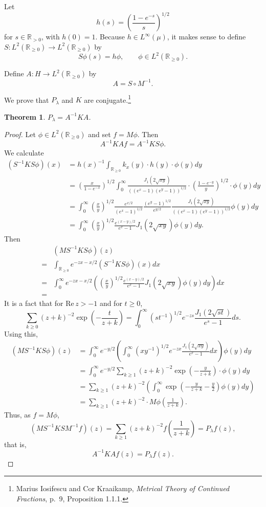 \documentclass{article}
\def\Re{\ensuremath{\mathrm{Re}}\,}
\newtheorem{theorem}{Theorem}
\theoremstyle{definition}
\begin{document}
Let 
\[
h(s)=\left(\frac{1-e^{-s}}{s} \right)^{1/2}
\]
for $s \in \mathbb{R}_{>0}$, with
$h(0)=1$.
 Because $h \in L^\infty(\mu)$, it makes sense to define
 $S:L^2(\mathbb{R}_{\geq 0}) \to L^2(\mathbb{R}_{\geq 0})$ by
\[
S \phi(s) = h \phi,\qquad \phi \in L^2(\mathbb{R}_{\geq 0}).
\]

Define $A:H \to L^2(\mathbb{R}_{\geq 0})$ by 
\[
A = S \circ M^{-1}.
\]


We prove that $P_\lambda$ and $K$ are conjugate.\footnote{Marius Iosifescu and Cor Kraaikamp,
{\em Metrical Theory of Continued Fractions}, p.~9, Proposition 1.1.1.}



\begin{theorem}
$P_\lambda = A^{-1}KA$.
\end{theorem}
\begin{proof}
Let $\phi \in L^2(\mathbb{R}_{\geq 0})$ and set $f=M\phi$. Then
\[
A^{-1}KAf = A^{-1}KS\phi.
\]
We calculate
\begin{align*}
(S^{-1}KS\phi)(x)&=h(x)^{-1} \int_{\mathbb{R}_{\geq 0}} k_x(y) \cdot h(y) \cdot \phi(y) dy\\
&=\left(\frac{x}{1-e^{-x}} \right)^{1/2}
\int_0^\infty 
 \frac{J_1(2 \sqrt{xy})}{((e^x-1)(e^y-1))^{1/2}}
 \cdot \left(\frac{1-e^{-y}}{y} \right)^{1/2}
 \cdot \phi(y) dy\\
 &=\int_0^\infty \left( \frac{x}{y} \right)^{1/2} \frac{e^{x/2}}{(e^x-1)^{1/2}} \frac{(e^y-1)^{1/2}}{e^{y/2}}  \frac{J_1(2 \sqrt{xy})}{((e^x-1)(e^y-1))^{1/2}}
 \phi(y) dy\\
 &=\int_0^\infty  \left( \frac{x}{y} \right)^{1/2} \frac{e^{(x-y)/2}}{e^x-1} J_1(2 \sqrt{xy})\phi(y) dy.
\end{align*}
Then
\[
\begin{split}
&(MS^{-1}KS\phi)(z)\\
=&\int_{\mathbb{R}_{\geq 0}} e^{-zx -x/2} (S^{-1}KS\phi)(x) dx\\
=&\int_0^\infty e^{-zx-x/2} \left(  \left( \frac{x}{y} \right)^{1/2} \frac{e^{(x-y)/2}}{e^x-1} J_1(2 \sqrt{xy})\phi(y) dy \right) dx\\
=&
\end{split}
\]
It is a fact that for $\Re z>-1$ and for $t \geq 0$,
\[
\sum_{k \geq 0} (z+k)^{-2} \exp\left(-\frac{t}{z+k} \right) = \int_0^\infty (s t^{-1})^{1/2} e^{-zs} \frac{J_1(2\sqrt{st})}{e^s-1} ds.
\]
Using this,
\begin{align*}
(MS^{-1}KS\phi)(z)&=\int_0^\infty e^{-y/2} \left( \int_0^\infty  (xy^{-1})^{1/2}  e^{-zx} \frac{J_1(2\sqrt{xy})}{e^x-1} dx\right) \phi(y) dy\\
&=\int_0^\infty e^{-y/2} \sum_{k \geq 1} (z+k)^{-2} \exp\left(-\frac{y}{z+k} \right) \cdot \phi(y) dy\\
&=\sum_{k \geq 1} (z+k)^{-2} \left( \int_0^\infty  \exp\left(-\frac{y}{z+k}-\frac{y}{2} \right)  \phi(y) dy\right)\\
&=\sum_{k \geq 1} (z+k)^{-2} \cdot M\phi\left(\frac{1}{z+k}\right).
\end{align*}
Thus, as $f=M\phi$,
\[
(MS^{-1}KSM^{-1}f)(z) = \sum_{k \geq 1} (z+k)^{-2} f\left(\frac{1}{z+k}\right) = P_\lambda f(z),
\]
that is,
\[
A^{-1}KAf(z) = P_\lambda f(z).
\]

\end{proof}
\end{document}

